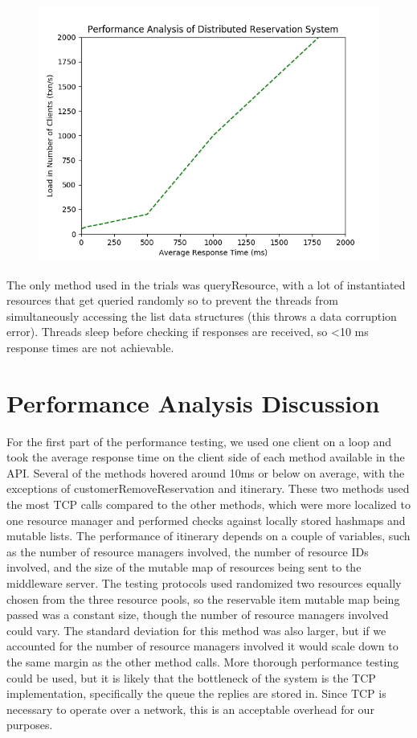 \documentclass[letterpaper,12pt]{article}
\begin{document}
	\begin{figure}[ht] 
		\centering \includegraphics[width=0.8\columnwidth]{performanal.png}
	\end{figure}

	The only method used in the trials was queryResource, with a lot of instantiated resources that get queried randomly so to prevent the threads from simultaneously accessing the list data structures (this throws a data corruption error). Threads sleep before checking if responses are received, so <10 ms response times are not achievable.
	
	\section{Performance Analysis Discussion}
	For the first part of the performance testing, we used one client on a loop and took the average response time on the client side of each method available in the API. Several of the methods hovered around 10ms or below on average, with the exceptions of customerRemoveReservation and itinerary. These two methods used the most TCP calls compared to the other methods, which were more localized to one resource manager and performed checks against locally stored hashmaps and mutable lists. The performance of itinerary depends on a couple of variables, such as the number of resource managers involved, the number of resource IDs involved, and the size of the mutable map of resources being sent to the middleware server. The testing protocols used randomized two resources equally chosen from the three resource pools, so the reservable item mutable map being passed was a constant size, though the number of resource managers involved could vary. The standard deviation for this method was also larger, but if we accounted for the number of resource managers involved it would scale down to the same margin as the other method calls. More thorough performance testing could be used, but it is likely that the bottleneck of the system is the TCP implementation, specifically the queue the replies are stored in. Since TCP is necessary to operate over a network, this is an acceptable overhead for our purposes.\\
	
\end{document}
